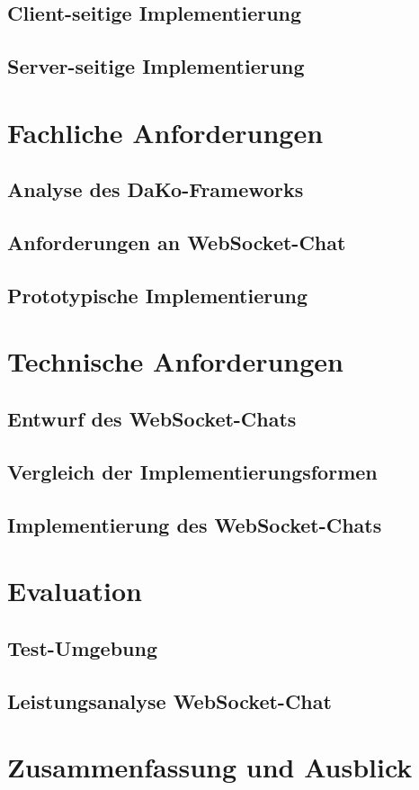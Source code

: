 \documentclass[11pt,a4paper,titlepage]{scrartcl}
\numberwithin{equation}{section}
\begin{document}
\subsection{Client-seitige Implementierung}
\subsection{Server-seitige Implementierung}

\section{Fachliche Anforderungen}
\subsection{Analyse des DaKo-Frameworks}
\subsection{Anforderungen an WebSocket-Chat}
\subsection{Prototypische Implementierung}

\section{Technische Anforderungen}
\subsection{Entwurf des WebSocket-Chats}
\subsection{Vergleich der Implementierungsformen}
\subsection{Implementierung des WebSocket-Chats}

\section{Evaluation}
\subsection{Test-Umgebung}
\subsection{Leistungsanalyse WebSocket-Chat}

\section{Zusammenfassung und Ausblick}

\newpage
{}
\printbibliography

\end{document}
